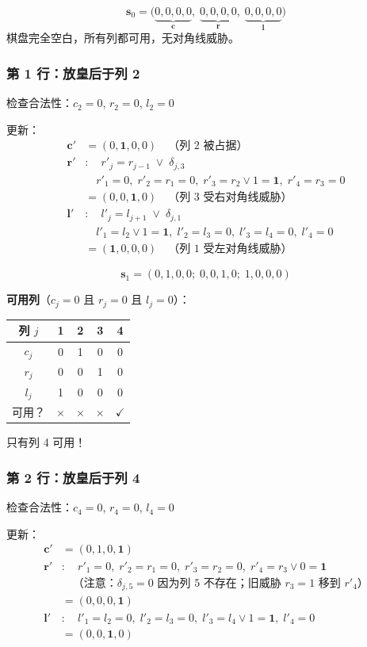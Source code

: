 \documentclass[12pt,a4paper]{ctexart}
\begin{document}
\[
\mathbf{s}_0 = \Big(\underbrace{0,0,0,0}_{\mathbf{c}},\; \underbrace{0,0,0,0}_{\mathbf{r}},\; \underbrace{0,0,0,0}_{\mathbf{l}}\Big)
\]
棋盘完全空白，所有列都可用，无对角线威胁。

\subsubsection*{第 1 行：放皇后于列 2}

检查合法性：$c_2 = 0$, $r_2 = 0$, $l_2 = 0$ \checkmark

更新：
\begin{align*}
\mathbf{c}' &= (0, \mathbf{1}, 0, 0) \quad\text{（列 2 被占据）} \\
\mathbf{r}' &: \quad r'_j = r_{j-1} \;\lor\; \delta_{j,3} \\
&\quad r'_1 = 0,\; r'_2 = r_1 = 0,\; r'_3 = r_2 \lor 1 = \mathbf{1},\; r'_4 = r_3 = 0 \\
&= (0, 0, \mathbf{1}, 0) \quad\text{（列 3 受右对角线威胁）} \\
\mathbf{l}' &: \quad l'_j = l_{j+1} \;\lor\; \delta_{j,1} \\
&\quad l'_1 = l_2 \lor 1 = \mathbf{1},\; l'_2 = l_3 = 0,\; l'_3 = l_4 = 0,\; l'_4 = 0 \\
&= (\mathbf{1}, 0, 0, 0) \quad\text{（列 1 受左对角线威胁）}
\end{align*}

\[
\mathbf{s}_1 = (0,1,0,0;\; 0,0,1,0;\; 1,0,0,0)
\]

\textbf{可用列}（$c_j = 0$ 且 $r_j = 0$ 且 $l_j = 0$）：
\begin{center}
\begin{tabular}{c|cccc}
列 $j$ & 1 & 2 & 3 & 4 \\ \hline
$c_j$ & 0 & 1 & 0 & 0 \\
$r_j$ & 0 & 0 & 1 & 0 \\
$l_j$ & 1 & 0 & 0 & 0 \\
可用？ & $\times$ & $\times$ & $\times$ & $\checkmark$
\end{tabular}
\end{center}
只有列 4 可用！

\subsubsection*{第 2 行：放皇后于列 4}

检查合法性：$c_4 = 0$, $r_4 = 0$, $l_4 = 0$ \checkmark

更新：
\begin{align*}
\mathbf{c}' &= (0, 1, 0, \mathbf{1}) \\
\mathbf{r}' &: \quad r'_1 = 0,\; r'_2 = r_1 = 0,\; r'_3 = r_2 = 0,\; r'_4 = r_3 \lor 0 = \mathbf{1} \\
&\quad\text{（注意：$\delta_{j,5} = 0$ 因为列 5 不存在；旧威胁 $r_3 = 1$ 移到 $r'_4$）} \\
&= (0, 0, 0, \mathbf{1}) \\
\mathbf{l}' &: \quad l'_1 = l_2 = 0,\; l'_2 = l_3 = 0,\; l'_3 = l_4 \lor 1 = \mathbf{1},\; l'_4 = 0 \\
&= (0, 0, \mathbf{1}, 0)
\end{align*}
\end{document}
